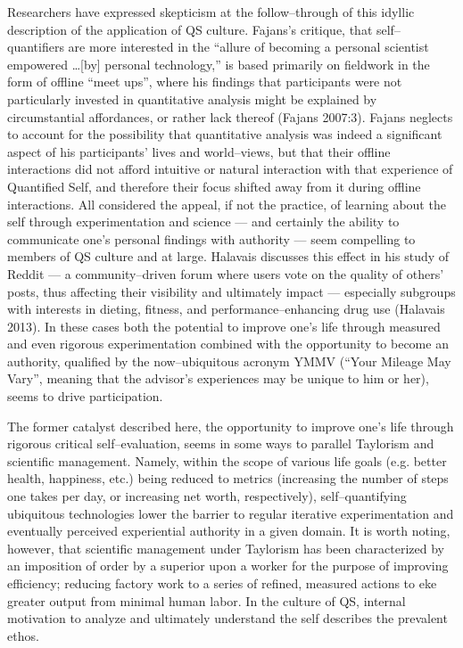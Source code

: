 \documentclass{article}
\begin{document}
Researchers have expressed skepticism at the follow--through of this idyllic description of the application of QS culture.
Fajans's critique,
that self--quantifiers are more interested in the ``allure of becoming a personal scientist empowered \dots [by] personal technology,'' is based primarily on fieldwork in the form of offline ``meet ups'',
where his findings that participants were not particularly invested in quantitative analysis might be explained by circumstantial affordances,
or rather lack thereof
(Fajans 2007:3).
Fajans neglects to account for the possibility that quantitative analysis was indeed a significant aspect of his participants' lives and world--views,
but that their offline interactions did not afford intuitive or natural interaction with that experience of Quantified Self,
and therefore their focus shifted away from it during offline interactions.
All considered the appeal,
if not the practice,
of learning about the self through experimentation and science
--- and certainly the ability to communicate one's personal findings with authority ---
seem compelling to members of QS culture and at large.
Halavais discusses this effect in his study of Reddit
--- a community--driven forum where users vote on the quality of others' posts,
thus affecting their visibility and ultimately impact
--- especially subgroups with interests in dieting,
fitness,
and performance--enhancing drug use
(Halavais 2013).
In these cases both the potential to improve one's life through measured and even rigorous experimentation combined with the opportunity to become an authority,
qualified by the now--ubiquitous acronym YMMV (``Your Mileage May Vary'',
meaning that the advisor's experiences may be unique to him or her),
seems to drive participation.

The former catalyst described here,
the opportunity to improve one's life through rigorous critical self--evaluation,
seems in some ways to parallel Taylorism and scientific management.
Namely,
within the scope of various life goals (e.g.
better health,
happiness,
etc.) being reduced to metrics (increasing the number of steps one takes per day,
or increasing net worth,
respectively),
self--quantifying ubiquitous technologies lower the barrier to regular iterative experimentation and eventually perceived experiential authority in a given domain.
It is worth noting,
however,
that scientific management under Taylorism has been characterized by an imposition of order by a superior upon a worker for the purpose of improving efficiency;
reducing factory work to a series of refined,
measured actions to eke greater output from minimal human labor.
In the culture of QS,
internal motivation to analyze and ultimately understand the self describes the prevalent ethos.
\end{document}
